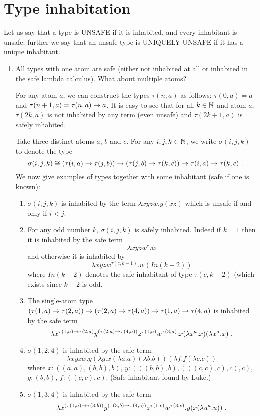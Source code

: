 \documentclass{article}
\begin{document}
\section{Type inhabitation}

Let us say that a type is UNSAFE if it is inhabited, and every
inhabitant is unsafe; further we say that an unsafe type is UNIQUELY
UNSAFE if it has a unique inhabitant.

\begin{enumerate}

\item All types with one atom are safe (either not inhabited at all or inhabited in the safe lambda calculus). What about multiple atoms?

For any atom $a$, we can construct the types $\tau(n,a)$
as follows: $\tau(0,a) = a$ and $\tau(n+1,a) = \tau(n,a) \rightarrow a$.
It is easy to see that for all $k\in\mathbb{N}$ and atom $a$, $\tau(2k,a)$ is not inhabited by any term (even unsafe) and $\tau(2k+1,a)$ is safely inhabited.

Take three distinct atoms $a$, $b$ and $c$. For any $i,j,k\in\mathbb{N}$, we write $\sigma(i,j,k)$ to denote the type
$$\sigma(i,j,k) \cong (\tau(i,a) \rightarrow \tau(j,b)) \rightarrow (\tau(j,b) \rightarrow \tau(k,c)) \rightarrow \tau(i,a) \rightarrow
\tau(k,c) \ .$$
We now give examples of types together with some inhabitant (safe if one is known):
\begin{enumerate}
\item $\sigma(i,j,k)$ is inhabited by the term $\lambda x y z w . y (x z)$ which is unsafe if and only if $i<j$.

\item For any odd number $k$, $\sigma(i,j,k)$ is safely inhabited. Indeed if $k=1$ then it is inhabited by the safe term
    $$\lambda x y z w^c. w$$
    and otherwise it is inhabited by
    $$\lambda x y z w^{\tau(c,k-1)}. w (In(k-2))$$
    where $In(k-2)$ denotes the safe inhabitant of type $\tau(c,k-2)$ (which exists since $k-2$ is odd.

\item The single-atom type
$(\tau(1,a) \rightarrow \tau(2,a)) \rightarrow (\tau(2,a) \rightarrow \tau(4,a)) \rightarrow \tau(1,a) \rightarrow
\tau(4,a)$ is inhabited by the safe term $$\lambda x^{\tau(1,a)
\typear \tau(2,a)} y^{(\tau(2,a) \typear \tau(4,a))} z^{\tau(1,a)}
w^{\tau(3,a)} . x (\lambda x^a . x) (\lambda x^a . x)\ .$$

\item $\sigma(1,2,4)$
is inhabited by the safe term:
$$ \lambda x y z w . y (\lambda g . x (\lambda a . a) (\lambda b . b)) (\lambda f . f (\lambda c . c))$$
where
$x : ((a, a), (b, b), b)$,
$y : (((b, b), b), (((c, c), c), c), c)$,
$g : (b, b)$,
$f : ((c, c), c)$. (Safe inhabitant found by Luke.)
\item
$\sigma(1,3,4)$
is inhabited by the safe term
$$ \lambda x^{(\tau(1,a) \typear \tau(3,b))} y^{(\tau(3,b) \typear \tau(4,c))} z^{\tau(1,c)} w^{\tau(3,c)} . y (x (\lambda u^a . u)) \ .$$


\end{enumerate}
\end{enumerate}
\end{document}

